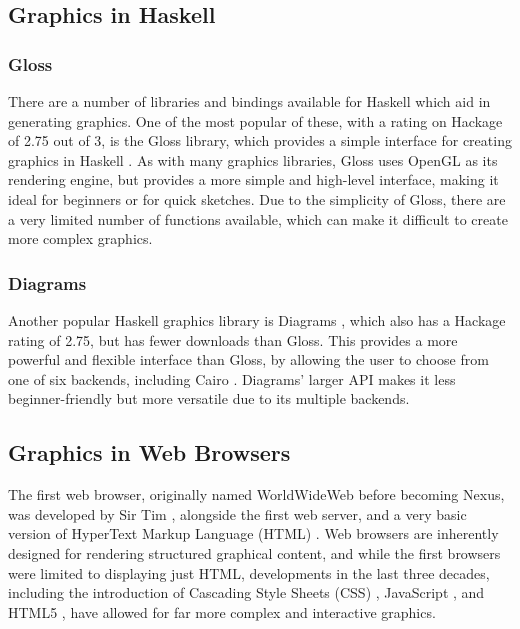 \documentclass[../main.tex]{subfiles}
\begin{document}
        \subsection{Graphics in Haskell}
            \subsubsection{Gloss}
                There are a number of libraries and bindings available for Haskell which aid in
                    generating graphics.
                One of the most popular of these, with a rating on Hackage of 2.75 out of 3, is
                    the Gloss library, which provides a simple interface for creating graphics in
                    Haskell \citep{hackageGloss}.
                As with many graphics libraries, Gloss uses OpenGL as its rendering engine, but
                    provides a more simple and high-level interface, making it ideal for beginners
                    or for quick sketches.
                Due to the simplicity of Gloss, there are a very limited number of functions
                    available, which can make it difficult to create more complex graphics.

            \subsubsection{Diagrams}
                Another popular Haskell graphics library is Diagrams \citep{hackageDiagrams},
                    which also has a Hackage rating of 2.75, but has fewer downloads than Gloss.
                This provides a more powerful and flexible interface than Gloss, by allowing
                    the user to choose from one of six backends, including Cairo \citep{cairo}.
                Diagrams' larger API makes it less beginner-friendly but more versatile due to
                    its multiple backends.


        \subsection{Graphics in Web Browsers}
            The first web browser, originally named WorldWideWeb before becoming Nexus, was
                developed by Sir Tim \citet{worldWideWeb}, alongside the first web server, and
                a very basic version of HyperText Markup Language (HTML) \citep{html}.
            Web browsers are inherently designed for rendering structured graphical
                content, and while the first browsers were limited to displaying just HTML,
                developments in the last three decades, including the introduction of Cascading
                Style Sheets (CSS) \citep{css}, JavaScript \citep{js}, and HTML5 \citep{html5},
                have allowed for far more complex and interactive graphics.
\end{document}
